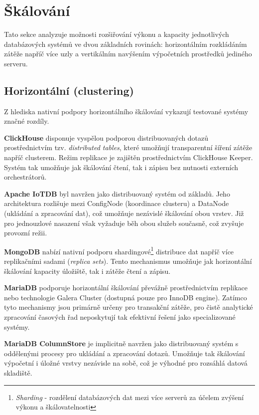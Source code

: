 \section{Škálování}\label{sec:scaling}

Tato sekce analyzuje možnosti rozšiřování výkonu a kapacity jednotlivých databázových systémů ve dvou základních rovinách: horizontálním rozkládáním zátěže napříč více uzly a vertikálním navýšením výpočetních prostředků jediného serveru.

\subsection{Horizontální (clustering)}

Z hlediska nativní podpory horizontálního škálování vykazují testované systémy značné rozdíly.

\textbf{ClickHouse} disponuje vyspělou podporou distribuovaných dotazů prostřednictvím tzv. \textit{distributed tables}, které umožňují transparentní šíření zátěže napříč clusterem. 
Režim replikace je zajištěn prostřednictvím ClickHouse Keeper. 
Systém tak umožňuje jak škálování čtení, tak i zápisu bez nutnosti externích orchestrátorů.

\textbf{Apache IoTDB} byl navržen jako distribuovaný systém od základů. 
Jeho architektura rozlišuje mezi ConfigNode (koordinace clusteru) a DataNode (ukládání a zpracování dat), což umožňuje nezávislé škálování obou vrstev. 
Již pro jednouzlové nasazení však vyžaduje běh obou služeb současně, což zvyšuje provozní režii.

\textbf{MongoDB} nabízí nativní podporu shardingové\footnote{\textit{Sharding} - rozdělení databázových dat mezi více serverů za účelem zvýšení výkonu a škálovatelnosti} distribuce dat napříč více replikačními sadami (\textit{replica sets}). 
Tento mechanismus umožňuje jak horizontální škálování kapacity úložiště, tak i zátěže čtení a zápisu.

\textbf{MariaDB} podporuje horizontální škálování převážně prostřednictvím replikace nebo technologie Galera Cluster (dostupná pouze pro InnoDB engine). Zatímco tyto mechanismy jsou primárně určeny pro transakční zátěže, pro čistě analytické zpracování časových řad neposkytují tak efektivní řešení jako specializované systémy.

\textbf{MariaDB ColumnStore} je implicitně navržen jako distribuovaný systém s oddělenými procesy pro ukládání a zpracování dotazů. 
Umožňuje tak škálování výpočetní i úložné vrstvy nezávisle na sobě, což je výhodné pro rozsáhlá datová skladiště.


